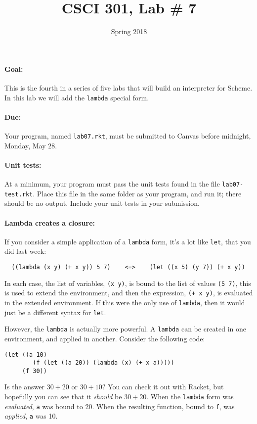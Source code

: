 \documentclass{article}
\title{CSCI 301, Lab \# 7}
\author{Spring 2018}
\date{}
\begin{document}
\maketitle


\paragraph{Goal:} This is the fourth in a series of five labs that will
build an interpreter for Scheme.  In this lab we will add the {\tt lambda}
special form.

\paragraph{Due:} Your program, named {\tt lab07.rkt}, must be submitted to
Canvas before midnight, Monday, May 28.

\paragraph{Unit tests:}
At a minimum, your program must pass the unit tests found in the
file {\tt lab07-test.rkt}.  Place this file in the same folder
as your program, and run it;  there should be no output.  Include
your unit tests in your submission.

\paragraph{Lambda creates a closure:}

If you consider a simple application of a {\tt lambda} form, it's a lot like
{\tt let}, that you did last week:
\begin{Verbatim}
  ((lambda (x y) (+ x y)) 5 7)    <=>    (let ((x 5) (y 7)) (+ x y))
\end{Verbatim}
In each case, the list of variables, {\tt (x y)}, is bound to the list
of values {\tt (5 7)}, this is used to extend the environment,
and then the expression, {\tt (+ x y)}, is evaluated in the extended
environment.
If this were the only use of {\tt lambda}, then it would just be a different
syntax for {\tt let}.

However, the {\tt lambda} is actually more powerful.  A {\tt lambda}
can be created in one environment, and applied in another.  Consider
the following code:
\begin{Verbatim}[frame=single]
  (let ((a 10)
        (f (let ((a 20)) (lambda (x) (+ x a)))))
     (f 30))
\end{Verbatim}  
Is the answer $30+20$ or $30+10$?  You can check it out with Racket,
but hopefully you can see that it {\em should} be $30+20$.  When the
{\tt lambda} form was {\em evaluated}, {\tt a} was bound to 20.  When
the resulting function, bound to {\tt f}, was {\em applied}, {\tt a}
was 10.
\end{document}
